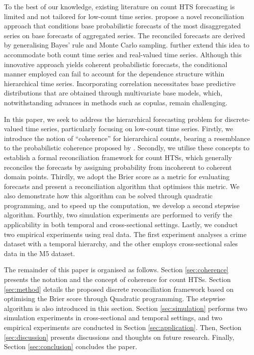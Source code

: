 \documentclass[a4paper,review,12pt,authoryear]{elsarticle}
\theoremstyle{definition}
\begin{document}
To the best of our knowledge, existing literature on count HTS forecasting is limited and not tailored for low-count time series.
\cite{coraniProbabilisticReconciliationCount2022} propose a novel reconciliation approach that conditions base probabilistic forecasts of the most disaggregated series on base forecasts of aggregated series.
The reconciled forecasts are derived by generalising Bayes’ rule and Monte Carlo sampling.
\cite{zambonEfficientProbabilisticReconciliation2022} further extend this idea to accommodate both count time series and real-valued time series.
Although this innovative approach yields coherent probabilistic forecasts,
the conditional manner employed can fail to account for the dependence structure within hierarchical time series.
Incorporating correlation necessitates base predictive distributions that are obtained through multivariate base models, which, notwithstanding advances in methods such as copulas, remain challenging.

In this paper, we seek to address the hierarchical forecasting problem for discrete-valued time series, particularly focusing on low-count time series.
Firstly, we introduce the notion of ``coherence'' for hierarchical counts,
bearing a resemblance to the probabilistic coherence proposed by \cite{panagiotelisProbabilisticForecastReconciliation2022}.
Secondly, we utilise these concepts to establish a formal reconciliation framework for count HTSs, which generally reconciles the forecasts by assigning probability from incoherent to coherent domain points.
Thirdly, we adopt the Brier score as a metric for evaluating forecasts and present a reconciliation algorithm that optimises this metric.
We also demonstrate how this algorithm can be solved through quadratic programming, and to speed up the computation, we develop a second stepwise algorithm.
Fourthly, two simulation experiments are performed to verify the applicability in both temporal and cross-sectional settings.
Lastly, we conduct two empirical experiments using real data. The first experiment analyses a crime dataset with a temporal hierarchy, and the other employs cross-sectional sales data in the M5 dataset.

The remainder of this paper is organised as follows.
Section \ref{sec:coherence} presents the notation and the concept of coherence for count HTSs.
Section \ref{sec:method} details the proposed discrete reconciliation framework based on optimising the Brier score through Quadratic programming. The stepwise algorithm is also introduced in this section.
Section \ref{sec:simulation} performs two simulation experiments in cross-sectional and temporal settings, and two empirical experiments are conducted in Section \ref{sec:application}.
Then, Section \ref{sec:discussion} presents discussions and thoughts on future research. 
Finally, Section \ref{sec:conclusion} concludes the paper.
\end{document}
